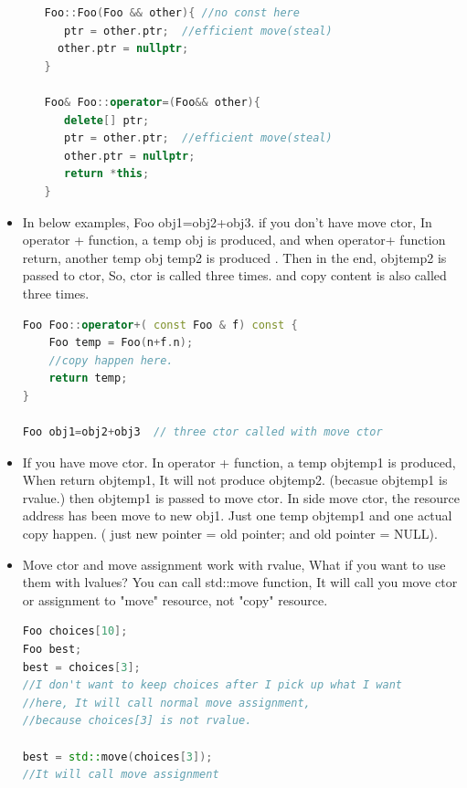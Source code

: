 \documentclass[a4paper,12pt,twoside]{book}
\begin{document}
\begin{itemize}
\begin{enumerate}
\begin{lstlisting}[frame=single, language=c++]
Foo::Foo(Foo && other){ //no const here
   ptr = other.ptr;  //efficient move(steal)
  other.ptr = nullptr;
}

Foo& Foo::operator=(Foo&& other){
   delete[] ptr;
   ptr = other.ptr;  //efficient move(steal)
   other.ptr = nullptr;
   return *this;
}
\end{lstlisting}

\end{enumerate}

\item In below examples, Foo obj1=obj2+obj3. if you don't have move ctor, In operator + function, a temp obj is produced,  and when operator+ function return, another temp obj temp2 is produced .  Then in the end, objtemp2 is passed to ctor,  So, ctor is called three times. and copy content is also called three times.

\begin{lstlisting}[frame=single, language=c++]
Foo Foo::operator+( const Foo & f) const {
    Foo temp = Foo(n+f.n);
    //copy happen here.
    return temp;
}

Foo obj1=obj2+obj3  // three ctor called with move ctor
\end{lstlisting}
\item If you have move ctor. In operator + function, a temp objtemp1 is produced,  When return objtemp1, It will not produce objtemp2. (becasue objtemp1 is rvalue.) then objtemp1 is passed to move ctor. In side move ctor, the resource address has been move to new obj1.  Just one temp objtemp1 and one actual copy happen. ( just new pointer = old pointer; and old pointer = NULL).

\item Move ctor and move assignment work with rvalue, What if you want to use them with lvalues? You can call std::move function, It will call you move ctor or assignment to "move" resource, not "copy" resource.
\begin{lstlisting}[frame=single, language=c++]
Foo choices[10];
Foo best;
best = choices[3];
//I don't want to keep choices after I pick up what I want
//here, It will call normal move assignment,
//because choices[3] is not rvalue.

best = std::move(choices[3]);
//It will call move assignment
\end{lstlisting}

\end{itemize}
\end{document}
